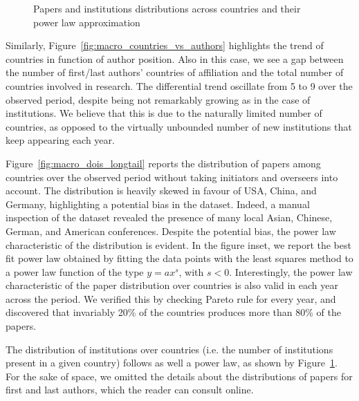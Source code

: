 \documentclass{llncs}
\begin{document}
\begin{figure}[t]
\begin{subfigure}{.5\textwidth}
	\caption[ ]{}
	\label{fig:macro_gridids_longtail}
\end{subfigure}
\caption{Papers and institutions distributions across countries and their power law approximation}
\label{fig:macro_longtail}
\end{figure}

Similarly, Figure~\ref{fig:macro_countries_vs_authors} highlights the trend of countries in function of author position.
Also in this case, we see a gap between the number of first/last authors' countries of affiliation and the total number of countries involved in research.
The differential trend oscillate from 5 to 9 over the observed period, despite being not remarkably growing as in the case of institutions.
We believe that this is due to the naturally limited number of countries, as opposed to the virtually unbounded number of new institutions that keep appearing each year.

Figure~\ref{fig:macro_dois_longtail} reports the distribution of papers among countries over the observed period without taking initiators and overseers into account.
The distribution is heavily skewed in favour of USA, China, and Germany, highlighting a potential bias in the dataset.
Indeed, a manual inspection of the dataset revealed the presence of many local Asian, Chinese, German, and American conferences.
Despite the potential bias, the power law characteristic of the distribution is evident. In the figure inset, we report the best fit power law obtained by fitting the data points with the least squares method to a power law function of the type $y = ax^s$, with $s<0$.
Interestingly, the power law characteristic of the paper distribution over countries is also valid in each year across the period. 
We verified this by checking Pareto rule\cite{pareto1971translation} for every year, and discovered that invariably 20\% of the countries produces more than 80\% of the papers.

The distribution of institutions over countries (i.e. the number of institutions present in a given country) follows as well a power law, as shown by Figure~\ref{fig:macro_gridids_longtail}.
For the sake of space, we omitted the details about the distributions of papers for first and last authors, which the reader can consult online.
\end{document}
